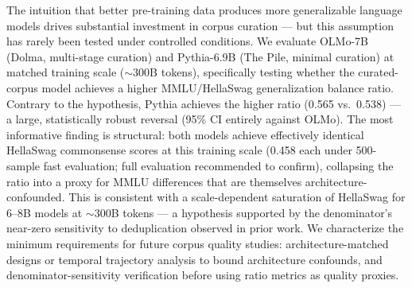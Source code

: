 The intuition that better pre-training data produces more generalizable language models drives substantial investment in corpus curation --- but this assumption has rarely been tested under controlled conditions. We evaluate OLMo-7B (Dolma, multi-stage curation) and Pythia-6.9B (The Pile, minimal curation) at matched training scale ($\sim$300B tokens), specifically testing whether the curated-corpus model achieves a higher MMLU/HellaSwag generalization balance ratio. Contrary to the hypothesis, Pythia achieves the higher ratio (0.565 vs.\ 0.538) --- a large, statistically robust reversal (95\% CI entirely against OLMo). The most informative finding is structural: both models achieve effectively identical HellaSwag commonsense scores at this training scale (0.458 each under 500-sample fast evaluation; full evaluation recommended to confirm), collapsing the ratio into a proxy for MMLU differences that are themselves architecture-confounded. This is consistent with a scale-dependent saturation of HellaSwag for 6--8B models at $\sim$300B tokens --- a hypothesis supported by the denominator's near-zero sensitivity to deduplication observed in prior work. We characterize the minimum requirements for future corpus quality studies: architecture-matched designs or temporal trajectory analysis to bound architecture confounds, and denominator-sensitivity verification before using ratio metrics as quality proxies.
